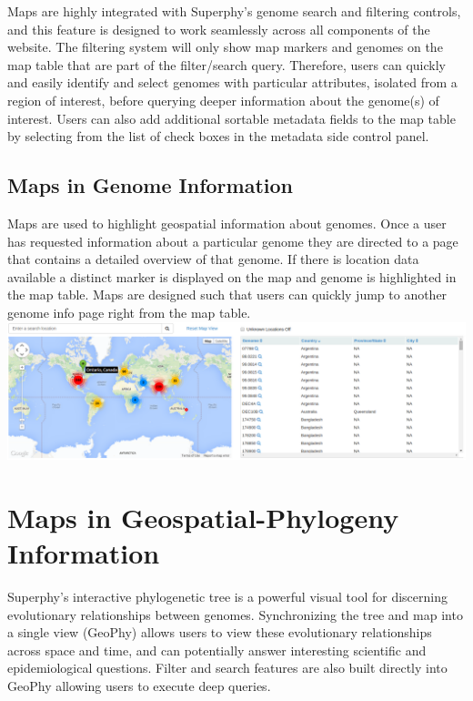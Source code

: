 \documentclass[12pt]{article}
\begin{document}
Maps are highly integrated with Superphy's genome search and filtering controls, and this feature is designed to work seamlessly across all components of the website. The filtering system will only show map markers and genomes on the map table that are part of the filter/search query. Therefore, users can quickly and easily identify and select genomes with particular attributes, isolated from a region of interest, before querying deeper information about the genome(s) of interest. Users can also add additional sortable metadata fields to the map table by selecting from the list of check boxes in the metadata side control panel. 

\pagebreak

\begin{landscape}

\section{Maps in Genome Information}

Maps are used to highlight geospatial information about genomes. Once a user has requested information about a particular genome they are directed to a page that contains a detailed overview of that genome. If there is location data available a distinct marker is displayed on the map and genome is highlighted in the map table. Maps are designed such that users can quickly jump to another genome info page right from the map table.\\

\includegraphics[scale=0.36]{../manuscript_images/genome-info.png}

\end{landscape}

\section{Maps in Geospatial-Phylogeny Information}

Superphy's interactive phylogenetic tree is a powerful visual tool for discerning evolutionary relationships between genomes. Synchronizing the tree and map into a single view (GeoPhy) allows users to view these evolutionary relationships across space and time, and can potentially answer interesting scientific and epidemiological questions. Filter and search features are also built directly into GeoPhy allowing users to execute deep queries.
\end{document}
